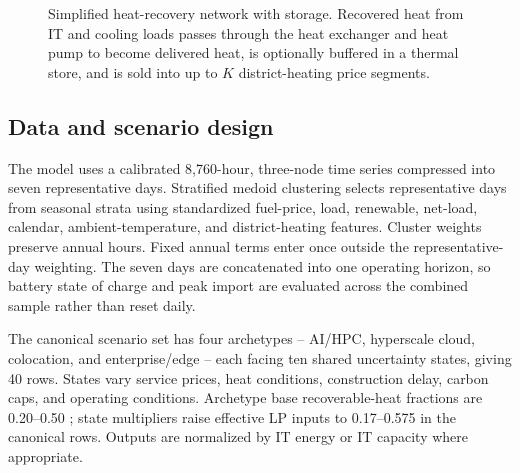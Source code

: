 \documentclass[preprint,12pt]{elsarticle}
\begin{document}
\begin{figure}[H]
\centering
{}
\caption{Simplified heat-recovery network with storage. Recovered heat from IT and cooling loads passes through the heat exchanger and heat pump to become delivered heat, is optionally buffered in a thermal store, and is sold into up to $K$ district-heating price segments.}
\label{fig:nodal-heat}
\end{figure}

\subsection{Data and scenario design}

The model uses a calibrated 8,760-hour, three-node time series compressed into seven representative days. Stratified medoid clustering selects representative days from seasonal strata using standardized fuel-price, load, renewable, net-load, calendar, ambient-temperature, and district-heating features. Cluster weights preserve annual hours. Fixed annual terms enter once outside the representative-day weighting. The seven days are concatenated into one operating horizon, so battery state of charge and peak import are evaluated across the combined sample rather than reset daily.

The canonical scenario set has four archetypes -- AI/HPC, hyperscale cloud, colocation, and enterprise/edge -- each facing ten shared uncertainty states, giving 40 rows. States vary service prices, heat conditions, construction delay, carbon caps, and operating conditions. Archetype base recoverable-heat fractions are 0.20--0.50 \cite{11,Hao2025}; state multipliers raise effective LP inputs to 0.17--0.575 in the canonical rows. Outputs are normalized by IT energy or IT capacity where appropriate.
\end{document}
